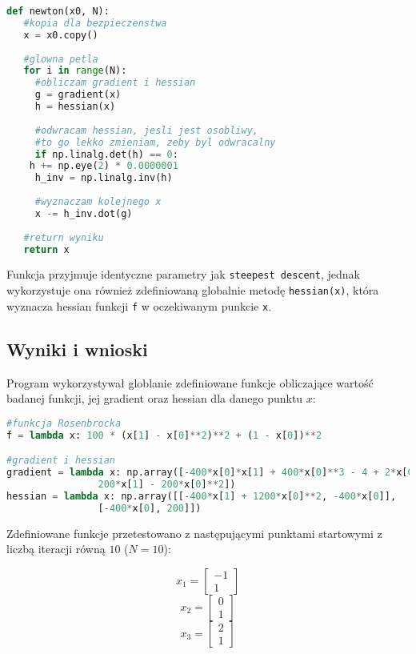 \documentclass{article}
\begin{document}
	\begin{lstlisting}[language=Python]
def newton(x0, N):
   #kopia dla bezpieczenstwa
   x = x0.copy()
		
   #glowna petla
   for i in range(N):
     #obliczam gradient i hessian
     g = gradient(x)
     h = hessian(x)
	  
     #odwracam hessian, jesli jest osobliwy, 
     #to go lekko zmieniam, zeby byl odwracalny
     if np.linalg.det(h) == 0:
   	h += np.eye(2) * 0.0000001
     h_inv = np.linalg.inv(h)
	  
     #wyznaczam kolejnego x
     x -= h_inv.dot(g)
		
   #return wyniku
   return x
	\end{lstlisting}

	Funkcja przyjmuje identyczne parametry jak \texttt{steepest descent}, jednak wykorzystuje ona również zdefiniowaną globalnie metodę \texttt{hessian(x)}, która wyznacza hessian funkcji \texttt{f} w oczekiwanym punkcie \texttt{x}.

	\subsection*{Wyniki i wnioski}

	Program wykorzystywał globlanie zdefiniowane funkcje obliczające wartość badanej funkcji, jej gradient oraz hessian dla danego punktu $x$:

	\begin{lstlisting}[language=Python]
#funkcja Rosenbrocka
f = lambda x: 100 * (x[1] - x[0]**2)**2 + (1 - x[0])**2

#gradient i hessian
gradient = lambda x: np.array([-400*x[0]*x[1] + 400*x[0]**3 - 4 + 2*x[0],
				200*x[1] - 200*x[0]**2])
hessian = lambda x: np.array([[-400*x[1] + 1200*x[0]**2, -400*x[0]], 
				[-400*x[0], 200]])

	\end{lstlisting}

	Zdefiniowane funkcje przetestowano z następującymi punktami startowymi z liczbą iteracji równą $10$ ($N=10$):

	\begin{equation}
		x_1 = \begin{bmatrix} -1 \\ 1 \end{bmatrix}
	\end{equation}
	\begin{equation}
		x_2 = \begin{bmatrix} 0 \\ 1 \end{bmatrix}
	\end{equation}
	\begin{equation}
		x_3 = \begin{bmatrix} 2 \\ 1 \end{bmatrix}
	\end{equation}
\end{document}
